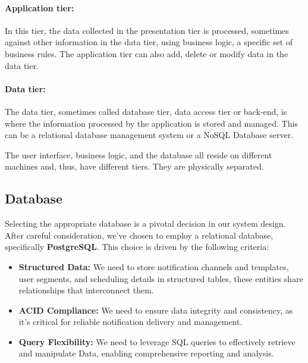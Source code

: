 \paragraph{Application tier:}
In this tier, the data collected in the presentation tier is processed, sometimes against other
information in the data tier, using business logic, a specific set of business rules. The application
tier can also add, delete or modify data in the data tier.

\paragraph{Data tier:}
The data tier, sometimes called database tier, data access tier or back-end, is where the information
processed by the application is stored and managed. This can be a relational database management system
or a NoSQL Database server.

The user interface, business logic, and the database all reside on different machines and, thus, have
different tiers. They are physically separated.



\subsection{Database}
Selecting the appropriate database is a pivotal decision in our system design. After careful consideration,
we've chosen to employ a relational database, specifically \textbf{PostgreSQL}. This choice is driven by the
following criteria:

\begin{itemize}
      \item \textbf{Structured Data:} We need to store notification channels and templates, user segments,
            and scheduling details in structured tables, these entities share relationships that
            interconnect them.
      \item \textbf{ACID Compliance:} We need to ensure data integrity and consistency, as it's critical
            for reliable notification delivery and management.
      \item \textbf{Query Flexibility:} We need to leverage SQL queries to effectively retrieve and manipulate
            Data, enabling comprehensive reporting and analysis.
\end{itemize}

